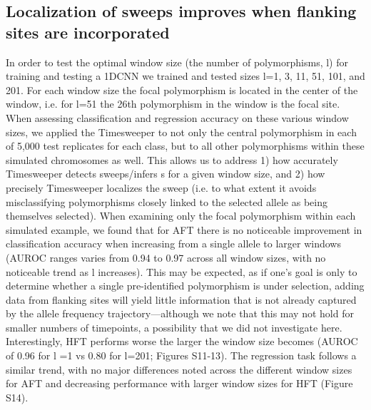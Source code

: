 \subsection{Localization of sweeps improves when flanking sites are incorporated}

In order to test the optimal window size (the number of polymorphisms, l) for training and testing a 1DCNN we trained and tested sizes l=1, 3, 11, 51, 101, and 201. For each window size the focal polymorphism is located in the center of the window, i.e. for l=51 the 26th polymorphism in the window is the focal site. When assessing classification and regression accuracy on these various window sizes, we applied the Timesweeper to not only the central polymorphism in each of 5,000 test replicates for each class, but to all other polymorphisms within these simulated chromosomes as well. This allows us to address 1) how accurately Timesweeper detects sweeps/infers s for a given window size, and 2) how precisely Timesweeper localizes the sweep (i.e. to what extent it avoids misclassifying polymorphisms closely linked to the selected allele as being themselves selected). 
When examining only the focal polymorphism within each simulated example, we found that for AFT there is no noticeable improvement in classification accuracy when increasing from a single allele to larger windows (AUROC ranges varies from 0.94 to 0.97 across all window sizes, with no noticeable trend as l increases). This may be expected, as if one’s goal is only to determine whether a single pre-identified polymorphism is under selection, adding data from flanking sites will yield little information that is not already captured by the allele frequency trajectory—although we note that this may not hold for smaller numbers of timepoints, a possibility that we did not investigate here. Interestingly, HFT performs worse the larger the window size becomes (AUROC of 0.96 for l =1 vs 0.80 for l=201; Figures S11-13). The regression task follows a similar trend, with no major differences noted across the different window sizes for AFT and decreasing performance with larger window sizes for HFT (Figure S14).
